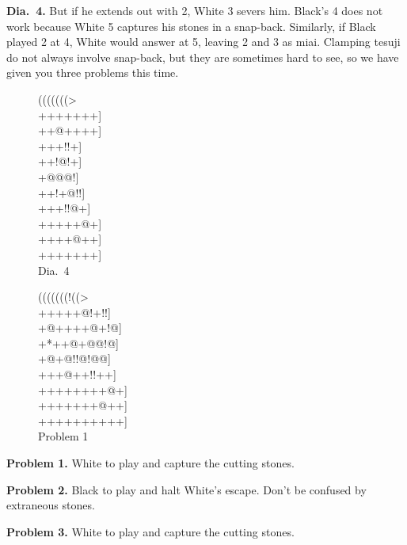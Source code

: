 \documentclass[mcrownvopaper,10pt,twopage,onecolumn,final]{memoir}
\begin{document}
\noindent
\textbf{Dia.\ 4.} But if he extends out with 2, White 3 severs him. Black's 4 does
not work because White 5 captures his stones in a snap-back. Similarly,
if Black played 2 at 4, White would answer at 5, leaving 2 and 3 as miai.
Clamping tesuji do not always involve snap-back, but they are sometimes
hard to see, so we have given you three problems this time.

\begin{figure}[ht]
    \begin{minipage}[c]{0.50\linewidth}
        \centering    
        {\gnos%
        (((((((>\\
        +++++++]\\
        ++@++++]\\
        +++{\gnosw{}}!!+]\\
        ++!{\gnosb{}}@!+]\\
        +{\gnosb{}}@{\gnosw{}}@@!]\\
        ++!+@!!]\\
        +++!!@+]\\
        +++++@+]\\
        ++++@++]\\
        +++++++]\\
        }
        Dia.\ 4
    \end{minipage}%
    \begin{minipage}[c]{0.50\linewidth}
        \centering    
        {\gnos%
        (((((((!((>\\
        +++++@!+!!]\\
        +@++++@+!@]\\
        +*++@+@@!@]\\
        +@+@!!@!@@]\\
        +++@++!!++]\\
        ++++++++@+]\\
        +++++++@++]\\
        ++++++++++]\\
        }
        Problem 1
    \end{minipage}%
\end{figure}

\noindent
\textbf{Problem 1.} White to play and capture the cutting stones.

\noindent
\textbf{Problem 2.} Black to play and halt White's escape. Don't be confused by
extraneous stones.

\noindent
\textbf{Problem 3.} White to play and capture the cutting stones.
\end{document}
